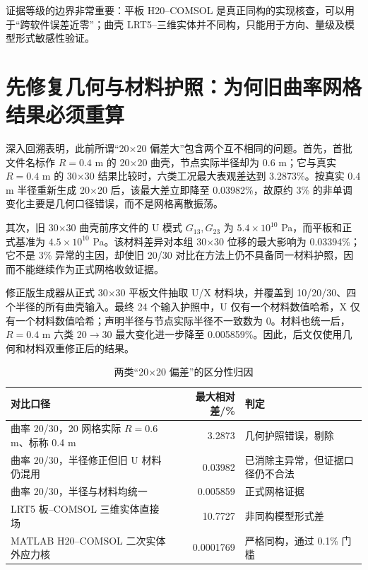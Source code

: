 \documentclass[UTF8,fontset=windows,11pt,a4paper]{ctexart}
\begin{document}
证据等级的边界非常重要：平板 H20--COMSOL 是真正同构的实现核查，可以用于“跨软件误差近零”；曲壳 LRT5--三维实体并不同构，只能用于方向、量级及模型形式敏感性验证。

\section{先修复几何与材料护照：为何旧曲率网格结果必须重算}

深入回溯表明，此前所谓“20$\times$20 偏差大”包含两个互不相同的问题。首先，首批文件名标作 $R=0.4$ m 的 20$\times$20 曲壳，节点实际半径却为 0.6 m；它与真实 $R=0.4$ m 的 30$\times$30 结果比较时，六类工况最大表观差达到 3.2873\%。按真实 0.4 m 半径重新生成 20$\times$20 后，该最大差立即降至 0.03982\%，故原约 3\% 的非单调变化主要是几何口径错误，而不是网格离散振荡。

其次，旧 30$\times$30 曲壳前序文件的 U 模式 $G_{13},G_{23}$ 为 $5.4\times10^{10}$ Pa，而平板和正式基准为 $4.5\times10^{10}$ Pa。该材料差异对本组 30$\times$30 位移的最大影响为 0.03394\%；它不是 3\% 异常的主因，却使旧 20/30 对比在方法上仍不具备同一材料护照，因而不能继续作为正式网格收敛证据。

修正版生成器从正式 30$\times$30 平板文件抽取 U/X 材料块，并覆盖到 10/20/30、四个半径的所有曲壳输入。最终 24 个输入护照中，U 仅有一个材料数值哈希，X 仅有一个材料数值哈希；声明半径与节点实际半径不一致数为 0。材料也统一后，$R=0.4$ m 六类 20$\to$30 最大变化进一步降至 0.005859\%。因此，后文仅使用几何和材料双重修正后的结果。

\begin{table}[H]
\centering
\caption{两类“20$\times$20 偏差”的区分性归因}
\small
\begin{tabularx}{\textwidth}{>{\raggedright\arraybackslash}p{}rX}
\toprule
对比口径 & 最大相对差/\% & 判定 \\
\midrule
曲率 20/30，20 网格实际 $R=0.6$ m、标称 0.4 m & 3.2873 & 几何护照错误，剔除 \\
曲率 20/30，半径修正但旧 U 材料仍混用 & 0.03982 & 已消除主异常，但证据口径仍不合法 \\
曲率 20/30，半径与材料均统一 & 0.005859 & 正式网格证据 \\
LRT5 板--COMSOL 三维实体直接场 & 10.7727 & 非同构模型形式差 \\
MATLAB H20--COMSOL 二次实体外应力核 & 0.0001769 & 严格同构，通过 0.1\% 门槛 \\
\bottomrule
\end{tabularx}
\end{table}
\end{document}
